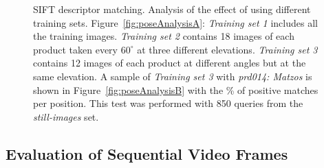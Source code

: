 \begin{figure}[h!]
\centering
{}


\caption{SIFT descriptor matching. Analysis of the effect of using different training sets. Figure~\ref{fig:poseAnalysisA}: \textit{Training set 1} includes all the training images. \textit{Training set 2} contains 18 images of each product taken every $60^\circ$ at three different elevations. \textit{Training set 3} contains 12 images of each product at different angles but at the same elevation. A sample of \textit{Training set 3} with \textit{prd014: Matzos} is shown in Figure~\ref{fig:poseAnalysisB} with the \% of positive matches per position. This test was performed with 850 queries from the \textit{still-images} set.}
        \label{fig:poseAnalysis}
\end{figure}


\subsection{Evaluation of Sequential Video Frames} \label{subsec:evaluationframes}

